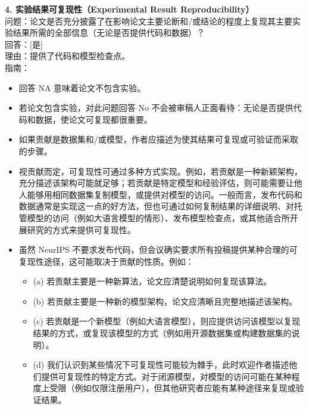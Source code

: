 \documentclass[11pt,UTF8,fontset=fandol]{ctexart}
\begin{document}
\textbf{4. 实验结果可复现性（Experimental Result Reproducibility）}\\
问题：论文是否充分披露了在影响论文主要论断和/或结论的程度上复现其主要实验结果所需的全部信息（无论是否提供代码和数据）？\\
回答：[是]\\
理由：提供了代码和模型检查点。\\
指南：
\begin{itemize}[leftmargin=1.5em,itemsep=1pt]
\item 回答 NA 意味着论文不包含实验。
\item 若论文包含实验，对此问题回答 No 不会被审稿人正面看待：无论是否提供代码和数据，使论文可复现都很重要。
\item 如果贡献是数据集和/或模型，作者应描述为使其结果可复现或可验证而采取的步骤。
\item 视贡献而定，可复现性可通过多种方式实现。例如，若贡献是一种新颖架构，充分描述该架构可能就足够；若贡献是特定模型和经验评估，则可能需要让他人能够用相同数据集复制模型，或提供对模型的访问。一般而言，发布代码和数据通常是实现这一点的好方法，但也可通过如何复制结果的详细说明、对托管模型的访问（例如大语言模型的情形）、发布模型检查点，或其他适合所开展研究的方式来提供可复现性。
\item 虽然 NeurIPS 不要求发布代码，但会议确实要求所有投稿提供某种合理的可复现性途径，这可能取决于贡献的性质。例如：
  \begin{itemize}[leftmargin=1.5em,itemsep=1pt]
  \item (a) 若贡献主要是一种新算法，论文应清楚说明如何复现该算法。
  \item (b) 若贡献主要是一种新的模型架构，论文应清晰且完整地描述该架构。
  \item (c) 若贡献是一个新模型（例如大语言模型），则应提供访问该模型以复现结果的方式，或复现该模型的方式（例如用开源数据集或构建数据集的说明）。
  \item (d) 我们认识到某些情况下可复现性可能较为棘手，此时欢迎作者描述他们提供可复现性的特定方式。对于闭源模型，对模型的访问可能在某种程度上受限（例如仅限注册用户），但其他研究者应能有某种途径来复现或验证结果。
  \end{itemize}
\end{itemize}
\end{document}
